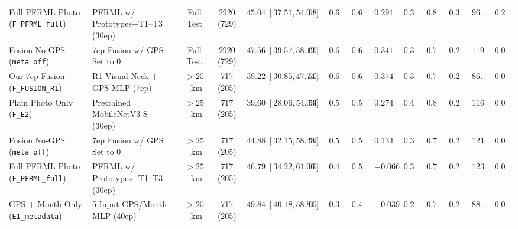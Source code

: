 \documentclass[conference]{IEEEtran}
\begin{document}
\begin{table}[t]
{\begin{tabular}{llcccccccccccc}
      Full PFRML Photo (\texttt{F\_PFRML\_full}) & PFRML w/ Prototypes+T1--T3 (30ep)  &      Full Test      &           2920 (729)            &     $45.04\;[37.51, 54.04]$      &     $68.56$      &     $0.6039$      &     $0.6574$      &      $0.2914$      &     $0.3986$      &             $0.8134$             &     $0.3687$      &     $96.54$      &     $0.2752$      \\
      Fusion No-GPS (\texttt{meta\_off})         & 7ep Fusion w/ GPS Set to 0         &      Full Test      &           2920 (729)            &     $47.56\;[39.57, 58.12]$      &     $66.12$      &     $0.6936$      &     $0.6757$      &      $0.3411$      &     $0.3428$      &             $0.7897$             &     $0.2556$      &     $119.80$     &     $0.0805$      \\
      \midrule
      Our 7ep Fusion (\texttt{F\_FUSION\_R1})    & R1 Visual Neck + GPS MLP (7ep)     &      $> 25$~km      &            717 (205)            & $\mathbf{39.22}\;[30.85, 47.74]$ & $\mathbf{50.68}$ & $\mathbf{0.6464}$ & $\mathbf{0.6696}$ & $\mathbf{0.3743}$  &     $0.3473$      &             $0.7741$             &     $0.2352$      & $\mathbf{86.00}$ &     $0.0000$      \\
      Plain Photo Only (\texttt{F\_E2})          & Pretrained MobileNetV3-S (30ep)    &      $> 25$~km      &            717 (205)            &     $39.60\;[28.06, 54.03]$      &     $54.56$      &     $0.5689$      &     $0.5623$      &      $0.2747$      & $\mathbf{0.4003}$ &        $\mathbf{0.8368}$         & $\mathbf{0.2743}$ &     $116.42$     &     $0.0000$      \\
      Fusion No-GPS (\texttt{meta\_off})         & 7ep Fusion w/ GPS Set to 0         &      $> 25$~km      &            717 (205)            &     $44.88\;[32.15, 58.48]$      &     $59.60$      &     $0.5091$      &     $0.5460$      &      $0.1346$      &     $0.3333$      &             $0.7699$             &     $0.2165$      &     $121.83$     &     $0.0000$      \\
      Full PFRML Photo (\texttt{F\_PFRML\_full}) & PFRML w/ Prototypes+T1--T3 (30ep)  &      $> 25$~km      &            717 (205)            &     $46.79\;[34.22, 61.06]$      &     $66.14$      &     $0.4121$      &     $0.5082$      &     $-0.0660$      &     $0.3291$      &             $0.7448$             &     $0.2221$      &     $123.82$     &     $0.0000$      \\
      GPS + Month Only (\texttt{E1\_metadata})   & 5-Input GPS/Month MLP (40ep)       &      $> 25$~km      &            717 (205)            &     $49.84\;[40.18, 58.81]$      &     $65.31$      &     $0.3797$      &     $0.4954$      &     $-0.0393$      &     $0.2929$      &             $0.7476$             &     $0.2004$      &     $88.83$      &     $0.0000$      \\
      \bottomrule
    \end{tabular}%
  }
\end{table}
\end{document}
